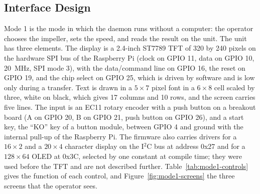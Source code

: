 \subsection{Interface Design}
\label{subsec:agit-hmi}

Mode 1 is the mode in which the daemon runs without a computer: the operator chooses the impeller, sets the speed, and reads the result on the unit. The unit has three elements. The display is a 2.4-inch ST7789 TFT of 320 by 240 pixels on the hardware SPI bus of the Raspberry Pi (clock on GPIO 11, data on GPIO 10, 20~MHz, SPI mode 3), with the data/command line on GPIO 16, the reset on GPIO 19, and the chip select on GPIO 25, which is driven by software and is low only during a transfer. Text is drawn in a $5\times7$ pixel font in a $6\times8$ cell scaled by three, white on black, which gives 17 columns and 10 rows, and the screen carries five lines. The input is an EC11 rotary encoder with a push button on a breakout board (A on GPIO 20, B on GPIO 21, push button on GPIO 26), and a start key, the ``KO'' key of a button module, between GPIO 4 and ground with the internal pull-up of the Raspberry Pi. The firmware also carries drivers for a $16\times2$ and a $20\times4$ character display on the I$^2$C bus at address 0x27 and for a $128\times64$ OLED at 0x3C, selected by one constant at compile time; they were used before the TFT and are not described further. Table~\ref{tab:mode1-controls} gives the function of each control, and Figure~\ref{fig:mode1-screens} the three screens that the operator sees.

